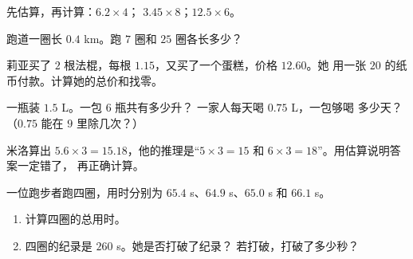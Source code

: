 \begin{exercise}[$\star$]\label{exo:g5:decimalops:6}
先估算，再计算：$6.2 \times 4$；\quad
$3.45 \times 8$；\quad $12.5 \times 6$。
\end{exercise}

\begin{exercise}[$\star$]\label{exo:g5:decimalops:7}
跑道一圈长 $0.4$ km。跑 $7$ 圈和
$25$ 圈各长多少？
\end{exercise}

\begin{exercise}[$\star$]\label{exo:g5:decimalops:8}
莉亚买了 $2$ 根法棍，每根 $1.15$，又买了一个蛋糕，价格 $12.60$。她
用一张 $20$ 的纸币付款。计算她的总价和找零。
\end{exercise}

\begin{exercise}[$\star$]\label{exo:g5:decimalops:9}
一瓶装 $1.5$ L。一包 $6$ 瓶共有多少升？
一家人每天喝 $0.75$ L，一包够喝
多少天？（$0.75$ 能在 $9$ 里除几次？）
\end{exercise}

\begin{exercise}[$\star\star$]\label{exo:g5:decimalops:10}
米洛算出 $5.6 \times 3 = 15.18$，他的推理是“$5 \times 3 = 15$
和 $6 \times 3 = 18$”。用估算说明答案一定错了，
再正确计算。
\end{exercise}

\begin{exercise}[$\star\star$]\label{exo:g5:decimalops:11}
一位跑步者跑四圈，用时分别为 $65.4$ s、$64.9$ s、$65.0$ s 和
$66.1$ s。
\begin{enumerate}
  \item 计算四圈的总用时。
  \item 四圈的纪录是 $260$ s。她是否打破了纪录？
        若打破，打破了多少秒？
\end{enumerate}
\end{exercise}

